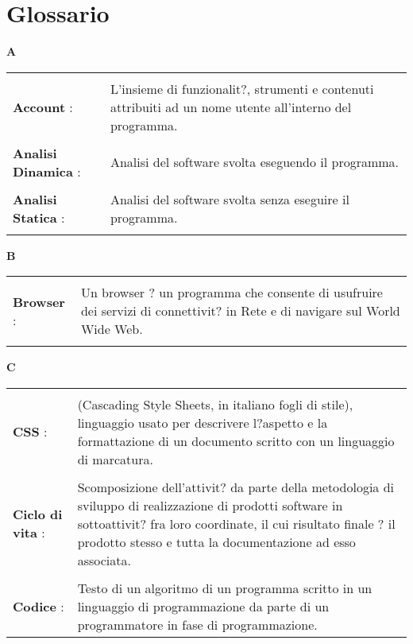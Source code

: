 \section{Glossario}{ 
\hfill\Huge{\textbf{A}} \\ 
\normalsize 
\begin{longtabu} to  
\toprule \\ 
\textbf{Account} : & L'insieme di funzionalit?, strumenti e contenuti attribuiti ad un nome utente all'interno del programma. \\ 
 \\ 
\textbf{Analisi Dinamica} : & Analisi del software svolta eseguendo il programma. \\ 
 \\ 
\textbf{Analisi Statica} : & Analisi del software svolta senza eseguire il programma. \\ 
 \\ 
\end{longtabu} 
\newpage 
\hfill\Huge{\textbf{B}} \\ 
\normalsize 
\begin{longtabu} to  
\toprule \\ 
\textbf{Browser} : & Un browser ? un programma che consente di usufruire dei servizi di connettivit? in Rete e di navigare sul World Wide Web. \\ 
 \\ 
\end{longtabu} 
\newpage 
\hfill\Huge{\textbf{C}} \\ 
\normalsize 
\begin{longtabu} to  
\toprule \\ 
\textbf{CSS} : & (Cascading Style Sheets, in italiano fogli di stile), linguaggio usato per descrivere l?aspetto e la formattazione di un documento scritto con un linguaggio di marcatura. \\ 
 \\ 
\textbf{Ciclo di vita} : & Scomposizione dell'attivit? da parte della metodologia di sviluppo di realizzazione di prodotti software in sottoattivit? fra loro coordinate, il cui risultato finale ? il prodotto stesso e tutta la documentazione ad esso associata. \\ 
 \\ 
\textbf{Codice} : & Testo di un algoritmo di un programma scritto in un linguaggio di programmazione da parte di un programmatore in fase di programmazione. \\ 

\end{longtabu}}
